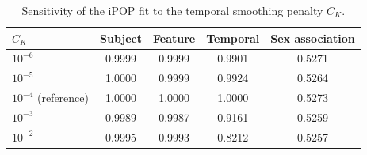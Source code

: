 \documentclass{article}
\begin{document}
\begin{table}[ht]
\centering
\caption{Sensitivity of the iPOP fit to the temporal smoothing penalty $C_K$.}
\label{tab:supp-smoothing}
\begin{tabular}{lcccc}
\hline
$C_K$ & Subject & Feature & Temporal & Sex association \\
\hline
$10^{-6}$ & 0.9999 & 0.9999 & 0.9901 & 0.5271 \\
$10^{-5}$ & 1.0000 & 0.9999 & 0.9924 & 0.5264 \\
$10^{-4}$ (reference) & 1.0000 & 1.0000 & 1.0000 & 0.5273 \\
$10^{-3}$ & 0.9989 & 0.9987 & 0.9161 & 0.5259 \\
$10^{-2}$ & 0.9995 & 0.9993 & 0.8212 & 0.5257 \\
\hline
\end{tabular}
\end{table}
\end{document}
